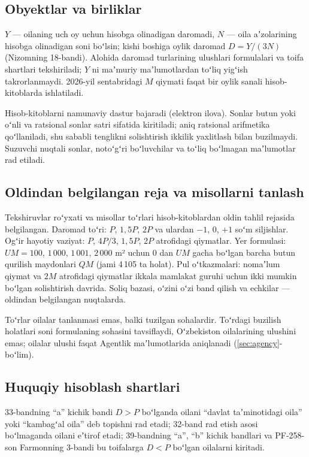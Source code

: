 \documentclass[12pt,a4paper]{extarticle}
\begin{document}
\subsection{Obyektlar va birliklar}
$Y$ — oilaning uch oy uchun hisobga olinadigan daromadi, $N$ — oila aʼzolarining hisobga olinadigan soni boʻlsin; kishi boshiga oylik daromad $D=Y/(3N)$ (Nizomning 18-bandi). Alohida daromad turlarining ulushlari formulalari va toifa shartlari tekshiriladi; $Y$ ni maʼmuriy maʼlumotlardan toʻliq yigʻish takrorlanmaydi. 2026-yil sentabridagi $M$ qiymati faqat bir oylik sanali hisob-kitoblarda ishlatiladi.

Hisob-kitoblarni namunaviy dastur bajaradi (elektron ilova). Sonlar butun yoki oʻnli va ratsional sonlar satri sifatida kiritiladi; aniq ratsional arifmetika qoʻllaniladi, shu sababli tenglikni solishtirish ikkilik yaxlitlash bilan buzilmaydi. Suzuvchi nuqtali sonlar, notoʻgʻri boʻluvchilar va toʻliq boʻlmagan maʼlumotlar rad etiladi.

\subsection{Oldindan belgilangan reja va misollarni tanlash}
Tekshiruvlar roʻyxati va misollar toʻrlari hisob-kitoblardan oldin tahlil rejasida belgilangan. Daromad toʻri: $P$, $1{,}5P$, $2P$ va ulardan $-1$, $0$, $+1$ soʻm siljishlar. Ogʻir hayotiy vaziyat: $P$, $4P/3$, $1{,}5P$, $2P$ atrofidagi qiymatlar. Yer formulasi: $UM=100$, $1\,000$, $1\,001$, $2\,000$ m² uchun $0$ dan $UM$ gacha boʻlgan barcha butun qurilish maydonlari $QM$ (jami 4\,105 ta holat). Pul oʻtkazmalari: nomaʼlum qiymat va $2M$ atrofidagi qiymatlar ikkala mamlakat guruhi uchun ikki mumkin boʻlgan solishtirish davrida. Soliq bazasi, oʻzini oʻzi band qilish va echkilar — oldindan belgilangan nuqtalarda.

Toʻrlar oilalar tanlanmasi emas, balki tuzilgan sohalardir. Toʻrdagi buzilish holatlari soni formulaning sohasini tavsiflaydi, Oʻzbekiston oilalarining ulushini emas; oilalar ulushi faqat Agentlik maʼlumotlarida aniqlanadi (\ref{sec:agency}-boʻlim).

\subsection{Huquqiy hisoblash shartlari}
33-bandning “a” kichik bandi $D>P$ boʻlganda oilani “davlat taʼminotidagi oila” yoki “kambagʻal oila” deb topishni rad etadi; 32-band rad etish asosi boʻlmaganda oilani eʼtirof etadi; 39-bandning “a”, “b” kichik bandlari va PF-258-son Farmonning 3-bandi bu toifalarga $D<P$ boʻlgan oilalarni kiritadi\cite{ref2,ref3}.
\end{document}
